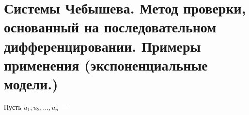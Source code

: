 
\section{Системы Чебышева. Метод проверки, основанный на последовательном дифференцировании. Примеры применения (экспоненциальные модели.)}

\begin{thm}
Пусть $u_1, u_2,…, u_n$ — 
\end{thm}